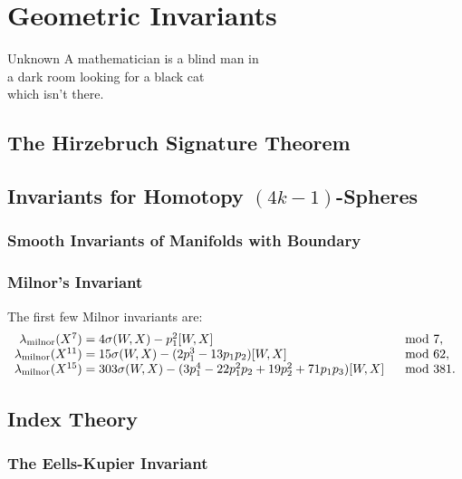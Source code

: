 \newcommand{\milinv}{\lambda_{\mathrm{milnor}}}

\chapter{Geometric Invariants}\label{chap:invariants}

\begin{epigraph}{15em}{Unknown}
	A mathematician is a blind man in \\
	a dark room looking for a black cat \\
	which isn’t there.
\end{epigraph}

\section{The Hirzebruch Signature Theorem}

\section{Invariants for Homotopy \texorpdfstring{$(4k-1)$}{(4k-1)}-Spheres}

\subsection{Smooth Invariants of Manifolds with Boundary}

\subsection{Milnor's Invariant}

\begin{example}
	The first few Milnor invariants are:
	\[
		\begin{array}{r@{\;}ll}
			\milinv(X^7)
			 &= 4\sigma(W, X) - p_1^2[W, X]
			 & \mod 7,                                                            \\
			\milinv(X^{11})
			 &= 15\sigma(W,X) - (2p_1^3-13p_1p_2)[W,X]
			 & \mod 62,                                                          \\
			\milinv(X^{15})
			 &= 303\sigma(W, X) - (3p_1^4-22p_1^2p_2 + 19p_2^2 + 71p_1p_3)[W,X]
			 & \mod 381.
		\end{array}
	\]
\end{example}

\section{Index Theory}

\subsection{The Eells-Kupier Invariant}
